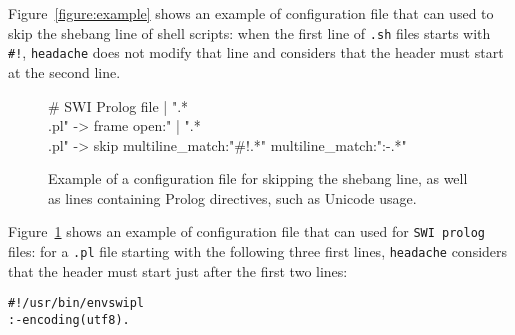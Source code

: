 \documentclass{article}
\newcommand{\mytt}[1]{\texttt{#1}}
\newcommand{\headache}{\mytt{headache}}
\begin{document}
Figure~\ref{figure:example} shows an example of configuration file
that can used to skip the shebang line of shell scripts:
when the first line of \mytt{.sh} files starts with \mytt{\#!},
\headache{} does not modify that line and considers that the header must
start at the second line.

\begin{figure}
\begin{center}
\begin{boxedverbatim}
# SWI Prolog file
 | ".*\\.pl" -> frame open:"%
 | ".*\\.pl" -> skip multiline_match:"#!.*" multiline_match:":-.*"
\end{boxedverbatim}
\end{center}
\caption{Example of a configuration file for skipping the shebang line,
  as well as lines containing Prolog directives, such as Unicode usage.}
  \label{figure:python-example}
\end{figure}

Figure~\ref{figure:python-example} shows an example of configuration file
that can used for \mytt{SWI prolog} files:
for a \mytt{.pl} file starting with the following three first lines,
\headache{} considers that the header must start just after the first two lines:
\begin{alltt}
  #!/usr/bin/env swipl
  :- encoding(utf8).
  % remainder of the file, that can be after the header
\end{alltt}
\end{document}
